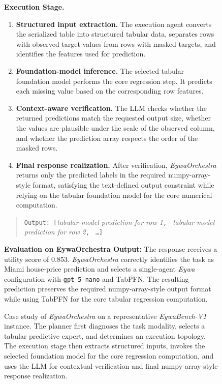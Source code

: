 \begin{figure}[h]
{\begin{tcolorbox}[colback=gray!5!white, colframe=pink!90, 
title=Case Study B.1: EywaOrchestra Example 1, boxrule=0.3mm, width=1.2\textwidth, arc=2mm, auto outer arc=true]
\textbf{Execution Stage.}
\begin{enumerate}
    \item \textbf{Structured input extraction.}
    The execution agent converts the serialized table into structured tabular data, separates rows with observed target values from rows with masked targets, and identifies the features used for prediction.

    \item \textbf{Foundation-model inference.}
    The selected tabular foundation model performs the core regression step. It predicts each missing value based on the corresponding row features.

    \item \textbf{Context-aware verification.}
    The LLM checks whether the returned predictions match the requested output size, whether the values are plausible under the scale of the observed column, and whether the prediction array respects the order of the masked rows.

    \item \textbf{Final response realization.}
    After verification, \textit{EywaOrchestra} returns only the predicted labels in the required numpy-array-style format, satisfying the text-defined output constraint while relying on the tabular foundation model for the core numerical computation.
\end{enumerate}

\begin{quote}
\small
\texttt{Output: [}\textit{tabular-model prediction for row 1}\texttt{, }
\textit{tabular-model prediction for row 2}\texttt{, }
\texttt{\ldots}\texttt{]}
\end{quote}

\textbf{Evaluation on EywaOrchestra Output:}
The response receives a utility score of \(0.853\). \textit{EywaOrchestra} correctly identifies the task as Miami house-price prediction and selects a single-agent \textit{Eywa} configuration with \texttt{gpt-5-nano} and TabPFN. The resulting prediction preserves the required numpy-array-style output format while using TabPFN for the core tabular regression computation.


\end{tcolorbox}}
\caption{
Case study of \textit{EywaOrchestra} on a representative \textit{EywaBench-V1} instance. The planner first diagnoses the task modality, selects a tabular predictive expert, and determines an execution topology. The execution stage then extracts structured inputs, invokes the selected foundation model for the core regression computation, and uses the LLM for contextual verification and final numpy-array-style response realization.
}
\label{fig:case_study_eywaorchestra}
\end{figure}
